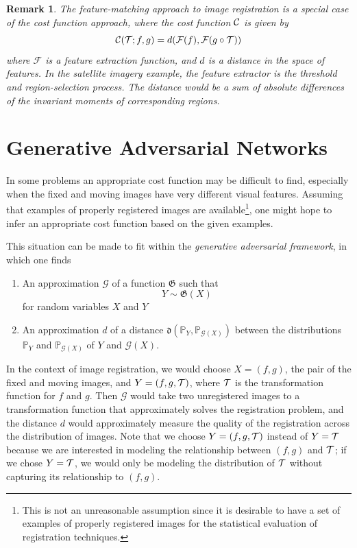 \documentclass{article}
\newtheorem{remark}{Remark}
\begin{document}
	\begin{remark}\label{rmk:feature_remark}
		The feature-matching approach to image registration is a special case of the cost function approach, where the cost function \(\mathcal{C}\) is given by
		\begin{equation}\label{eq:feature_matching_cost}
			\mathcal{C}(\mathcal{T}; f, g) = d(\mathcal{F}(f), \mathcal{F}(g \circ \mathcal{T}))
		\end{equation}
		where \(\mathcal{F}\) is a feature extraction function, and \(d\) is a distance in the space of features. In the satellite imagery example, the feature extractor is the threshold and region-selection process. The distance would be a sum of absolute differences of the invariant moments of corresponding regions.
	\end{remark}
	
	\section{Generative Adversarial Networks}
	\newcommand{\generator}{\mathcal{G}}
	\newcommand{\discriminator}{\mathcal{D}}
	\newcommand{\prob}{\mathbb{P}}
	In some problems an appropriate cost function may be difficult to find, especially when the fixed and moving images have very different visual features. Assuming that examples of properly registered images are available\footnote{This is not an unreasonable assumption since it is desirable to have a set of examples of properly registered images for the statistical evaluation of registration techniques.}, one might hope to infer an appropriate cost function based on the given examples. 
	
	This situation can be made to fit within the \textit{generative adversarial framework}, in which one finds 
	\begin{enumerate}
		\item An approximation \(\generator\) of a function \(\mathfrak{G}\) such that
		\begin{equation*}
			Y \sim \mathfrak{G}(X)
		\end{equation*}
		for random variables \(X\) and \(Y\)
		\item An approximation \(d\) of a distance \(\mathfrak{d}\left(\prob_Y, \prob_{\generator(X)}\right)\) between the distributions \(\prob_Y\) and \(\prob_{\generator(X)}\) of \(Y\) and \(\generator(X)\).
	\end{enumerate}
	
	In the context of image registration, we would choose \(X=(f, g)\), the pair of the fixed and moving images, and \(Y=(f, g, \mathcal{T})\), where \(\mathcal{T}\) is the transformation function for \(f\) and \(g\). Then \(\generator\) would take two unregistered images to a transformation function that approximately solves the registration problem, and the distance \(d\) would approximately measure the quality of the registration across the distribution of images. Note that we choose \(Y = (f, g, \mathcal{T})\) instead of \(Y = \mathcal{T}\) because we are interested in modeling the relationship between \((f,g)\) and \(\mathcal{T}\); if we chose \(Y = \mathcal{T}\), we would only be modeling the distribution of \(\mathcal{T}\) without capturing its relationship to \((f,g)\).
	
\end{document}
